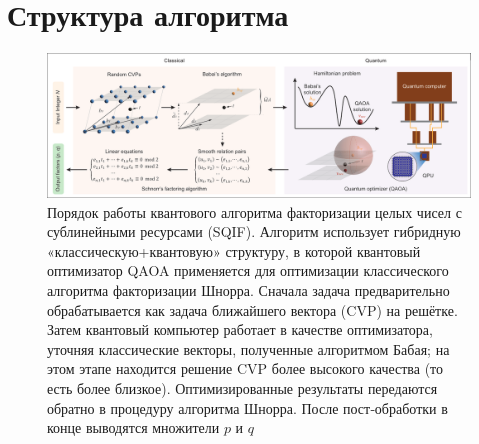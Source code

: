 
\section{Структура алгоритма}

\begin{figure}
    \centering
    \includegraphics[scale=0.4]{inc/fig_01.png}
    \caption{
        Порядок работы квантового алгоритма факторизации целых чисел с
        сублинейными ресурсами (SQIF). Алгоритм использует гибридную
        «классическую+квантовую» структуру, в которой квантовый оптимизатор
        QAOA применяется для оптимизации классического алгоритма факторизации
        Шнорра. Сначала задача предварительно обрабатывается как задача
        ближайшего вектора (CVP) на решётке. Затем квантовый компьютер
        работает в качестве оптимизатора, уточняя классические векторы,
        полученные алгоритмом Бабая; на этом этапе находится решение CVP
        более высокого качества (то есть более близкое). Оптимизированные
        результаты передаются обратно в процедуру алгоритма Шнорра. После
        пост‑обработки в конце выводятся множители $p$ и $q$
    }
    \label{fig:fig01}
\end{figure}

